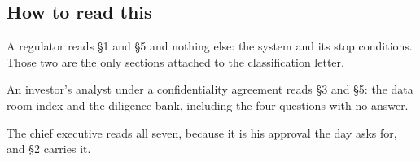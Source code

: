 \subsection{How to read this}

A regulator reads \S1 and \S5 and nothing else: the system and its stop
conditions. Those two are the only sections attached to the classification
letter.

An investor's analyst under a confidentiality agreement reads \S3 and \S5: the
data room index and the diligence bank, including the four questions with no
answer.

The chief executive reads all seven, because it is his approval the day asks for,
and \S2 carries it.
